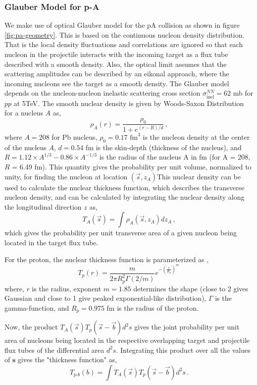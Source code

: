 \documentclass[11pt,onecolumn]{article}
\newcommand{\beq}{\begin{equation}}
\newcommand{\eeq}{\end{equation}}
\begin{document}
\subsubsection{Glauber Model for p-A}
We make use of optical Glauber model for the pA collision as shown in figure \ref{fig:pa-geometry}. This is based on the continuous nucleon density distribution. That is the local density fluctuations and correlations are ignored so that each nucleon in the projectile interacts with the incoming target as a flux tube described with a smooth density. Also, the optical limit assumes that the scattering amplitudes can be described by an eikonal approach, where the incoming nucleons see the target as a smooth density. The Glauber model depends on the nucleon-nucleon inelastic scattering cross section $\sigma^{NN}_{\text{inel}} = 62$ mb for $pp$ at 5TeV. The smooth nuclear density is given by Woods-Saxon Distribution for a nucleus $A$ as,
%
\beq
\rho_A(r) = \frac{\rho_0}{1+ e^{(r-R)/d}} \, ,
\eeq
%
where $A = 208$ for Pb nucleus, $\rho_0 = 0.17$ $\text{fm}^3$ is the nucleon density at the center of the nucleus $A$, $d = 0.54$ fm is the skin-depth (thickness of the nucleus), and $R = 1.12 \times A^{1/3} - 0.86 \times A^{-1/3}$ is the radius of the nucleus A in fm (for A = 208, $R$ = 6.49 fm). This quantity gives the probability per unit volume, normalized to unity, for finding the nucleon at location $(\vec{s}, z_A)$This nuclear density can be used to calculate the nuclear thickness function, which describes the transverse nucleon density, and can be calculated by integrating the nuclear density along the longitudinal direction $z$ as,
%
\beq
T_A(\vec{s}) = \int \rho_A(\vec{s}, z_A) dz_A \, ,
\eeq
%
which gives the probability per unit transverse area of a given nucleon being located in the target flux tube.



For the proton, the nuclear thickness function is parameterized as \cite{dEnterria:2020dwq},
\beq
T_p(r) = \frac{m}{2 \pi R_p^2 \Gamma(2/m)} e^{-(\frac{r}{R_p})^m} \, 
\eeq
where, $r$ is the radius, exponent $m = 1.85$ determines the shape (close to 2 gives Gaussian and close to 1 give peaked exponential-like distribution), $\Gamma$ is the gamma-function, and $R_p = 0.975 $ fm is the radius of the proton. 


Now, the product $T_A(\vec{s}) T_p(\vec{s}-\vec{b}) d^2s$ gives the joint probability per unit area of nucleons being located in the respective overlapping target and projectile flux tubes of the differential area $d^2s$. Integrating this product over all the values of $\textbf{s}$ gives the "thickness function" as,
\beq
T_{pA}(b) = \int T_A(\vec{s}) T_p(\vec{s}-\vec{b}) d^2s \, .
\eeq
\end{document}
